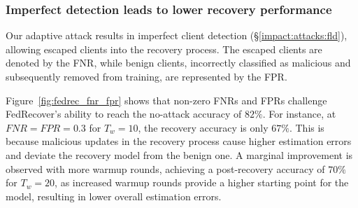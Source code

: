 \subsubsection{Imperfect detection leads to lower recovery performance}\label{impact:attacks:fdr}
Our adaptive attack results in imperfect client detection (\S\ref{impact:attacks:fld}), allowing escaped clients into the recovery process. The escaped clients are denoted by the FNR, while benign clients, incorrectly classified as malicious and subsequently removed from training, are represented by the FPR.

Figure~\ref{fig:fedrec_fnr_fpr} shows that non-zero FNRs and FPRs challenge FedRecover's ability to reach the no-attack accuracy of $82\%$. For instance, at $FNR=FPR=0.3$ for $T_w=10$, the recovery accuracy is only $67\%$. This is because malicious updates in the recovery process cause higher estimation errors and deviate the recovery model from the benign one. A marginal improvement is observed with more warmup rounds, achieving a post-recovery accuracy of $70\%$ for $T_w=20$, as increased warmup rounds provide a higher starting point for the model, resulting in lower overall estimation errors.
